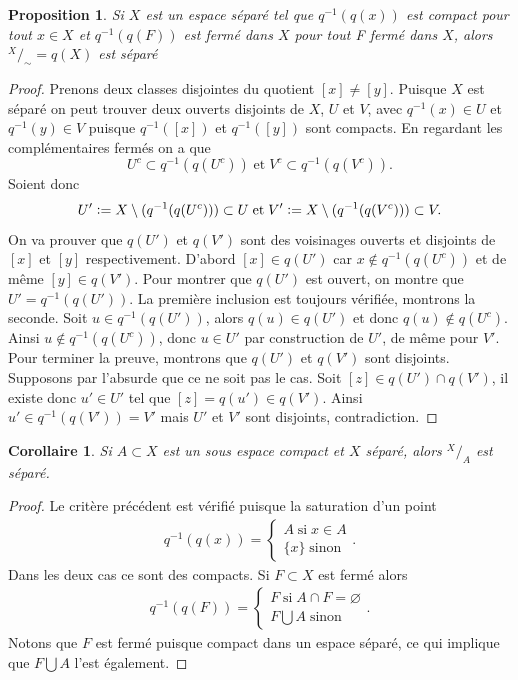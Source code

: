 \documentclass[12pt]{book}
\newcommand{\defeq}{\vcentcolon=}
\newtheorem{cor}[lemma]{Corollaire}
\newtheorem{prop}[lemma]{Proposition}
\theoremstyle{definition}
\theoremstyle{remark}
\newcommand*\quot[2]{{^{\textstyle #1}\big/_{\textstyle #2}}}
\begin{document}
	\begin{prop}
		Si $X$ est un espace séparé tel que $q^{-1}(q(x))$ est compact pour tout  $x\in X$ et $q^{-1}(q(F))$ est fermé dans $X$ pour tout F fermé dans $X$, alors $\quot{X}{\sim} = q(X)$ est séparé
	\end{prop}
	\begin{proof}
		Prenons deux classes disjointes du quotient $[x] \neq [y]$. Puisque $X$ est séparé on peut trouver deux ouverts disjoints de $X$, $U$ et $V$, avec $q^{-1}(x) \in U$ et  $q^{-1}(y) \in V$ puisque $q^{-1}([x])$ et  $q^{-1}([y])$ sont compacts. En regardant les complémentaires fermés on a que \[
			U^c \subset q^{-1}(q(U^c)) \; \text{et} \; V^c \subset q^{-1}(q(V^c))
		.\] Soient donc \[
		U' \defeq X\setminus(q^{-1}(q(U^c))) \subset U \; \text{et} \; V' \defeq X\setminus(q^{-1}(q(V^c))) \subset V
	.\]  On va prouver que $q(U')$ et  $q(V')$ sont des voisinages ouverts et disjoints de $[x]$ et $[y]$ respectivement. 
	D'abord $[x] \in q(U')$ car  $x \not\in q^{-1}(q(U^c))$ et de même  $[y] \in q(V')$. Pour montrer que $q(U')$ est ouvert, on montre que  $U' = q^{-1}(q(U'))$. La première inclusion est toujours vérifiée, montrons la seconde. Soit $u \in q^{-1}(q(U'))$, alors $q(u) \in q(U')$ et donc $q(u) \not\in q(U^c)$. Ainsi  $u \not\in q^{-1}(q(U^c))$, donc $u \in U'$ par construction de $U'$, de même pour $V'$. \\
	Pour terminer la preuve, montrons que $q(U')$ et  $q(V')$ sont disjoints. Supposons par l'absurde que ce ne soit pas le cas. Soit $[z] \in q(U')\cap q(V')$, il existe donc $u' \in U'$ tel que  $[z] = q(u') \in q(V')$. Ainsi $u' \in q^{-1}(q(V')) = V'$ mais  $U'$ et  $V'$ sont disjoints, contradiction.
	\end{proof}
	\begin{cor}
		Si $A \subset X$ est un sous espace compact et $X$ séparé, alors $\quot{X}{A}$ est séparé.
	\end{cor}
	\begin{proof}
		Le critère précédent est vérifié puisque la saturation d'un point
		\begin{align*}
			q^{-1}(q(x)) = \begin{cases}
				A \; \text{si} \; x \in A \\
				\{x\} \; \text{sinon} 
			\end{cases}
		.\end{align*} Dans les deux cas ce sont des compacts.
		Si $F \subset X$ est fermé alors 
		\begin{align*}
			q^{-1}(q(F)) = \begin{cases}
				F \; \text{si} \; A\cap F = \varnothing \\
				F \bigcup A \; \text{sinon}
			\end{cases}
		.\end{align*} Notons que $F$ est fermé puisque compact dans un espace séparé, ce qui implique que  $F \bigcup A$ l'est également.
	\end{proof}
\end{document}
